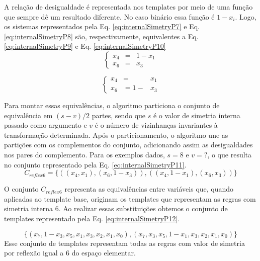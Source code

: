 A relação de desigualdade é representada nos templates por meio de uma função que sempre dê um resultado diferente. No caso binário essa função é $1 - x_i$. Logo, os sistemas representados pela Eq. \eqref{eq:internalSimetryP7} e Eq. \eqref{eq:internalSimetryP8} são, respectivamente, equivalentes a Eq. \eqref{eq:internalSimetryP9} e Eq. \eqref{eq:internalSimetryP10}
\begin{equation}
\left\{\begin{matrix}
x_4 & = & 1 - x_1\\ 
x_6 & = & x_3
\end{matrix}\right.
\label{eq:internalSimetryP9}
\end{equation}

\begin{equation}
\left\{\begin{matrix}
x_4 & = & x_1\\ 
x_6 & = 1 - & x_3
\end{matrix}\right.
\label{eq:internalSimetryP10}
\end{equation}

Para montar essas equivalências, o algoritmo particiona o conjunto de equivalência em $(s-v)/2$ partes, sendo que $s$ é o valor de simetria interna passado como argumento e $v$ é o número de vizinhanças invariantes à transformação determinada. Após o particionamento, o algoritmo une as partições com os complementos do conjunto, adicionando assim as desigualdades nos pares do complemento. Para os exemplos dados, $s=8$ e $v=?$, o que resulta no conjunto representado pela Eq. \eqref{eq:internalSimetryP11}.
\begin{equation}
C_{reflex6}=\{((x_4,x_1),(x_6,1-x_3)),((x_4,1-x_1),(x_6,x_3))\}
\label{eq:internalSimetryP11}
\end{equation}

O conjunto $C_{reflex6}$ representa as equivalências entre variáveis que, quando aplicadas ao template base, originam os templates que representam as regras com simetria interna 6. Ao realizar essas substituições obtemos o conjunto de templates representado pela Eq. \eqref{eq:internalSimetryP12}.

\begin{equation}
\{(x_7,1-x_3,x_5,x_1,x_3,x_2,x_1,x_0),(x_7,x_3,x_5,1-x_1,x_3,x_2,x_1,x_0)\}
\label{eq:internalSimetryP12}
\end{equation}
Esse conjunto de templates representam todas as regras com valor de simetria por reflexão igual a 6 do espaço elementar.

